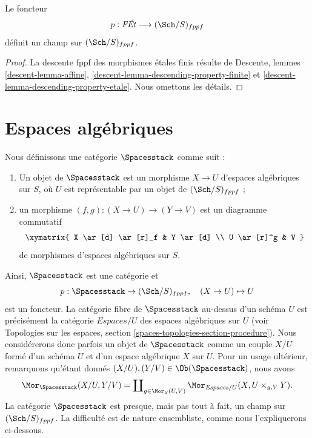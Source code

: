 \begin{lemma}
\label{lemma-finite-etale-stack}
Le foncteur
$$
p : \textit{F\'Et} \longrightarrow (\Sch/S)_{fppf}
$$
définit un champ sur $(\Sch/S)_{fppf}$.
\end{lemma}

\begin{proof}
La descente fppf des morphismes étales finis résulte de
Descente, lemmes \ref{descent-lemma-affine},
\ref{descent-lemma-descending-property-finite} et
\ref{descent-lemma-descending-property-etale}.
Nous omettons les détails.
\end{proof}






\section{Espaces algébriques}
\label{section-stack-of-spaces}

\noindent
Nous définissons une catégorie $\Spacesstack$ comme suit :
\begin{enumerate}
\item Un objet de $\Spacesstack$ est un morphisme $X \to U$
d'espaces algébriques sur $S$, où $U$ est représentable par un objet de
$(\Sch/S)_{fppf}$ ;
\item un morphisme $(f, g) : (X \to U) \to (Y \to V)$
est un diagramme commutatif
$$
\xymatrix{
X \ar[d] \ar[r]_f & Y \ar[d] \\
U \ar[r]^g & V
}
$$
de morphismes d'espaces algébriques sur $S$.
\end{enumerate}
Ainsi, $\Spacesstack$ est une catégorie et
$$
p : \Spacesstack \to (\Sch/S)_{fppf},
\quad
(X \to U) \mapsto U
$$
est un foncteur. La catégorie fibre de $\Spacesstack$ au-dessus
d'un schéma $U$ est précisément la catégorie $\textit{Espaces}/U$ des
espaces algébriques sur $U$ (voir
Topologies sur les espaces, section \ref{spaces-topologies-section-procedure}).
Nous considérerons donc parfois un objet de $\Spacesstack$ comme un
couple $X/U$ formé d'un schéma $U$ et d'un espace algébrique $X$ sur $U$.
Pour un usage ultérieur, remarquons qu'étant donnés
$(X/U), (Y/V) \in \Ob(\Spacesstack)$,
nous avons
\begin{equation}
\label{equation-morphisms-spaces}
\Mor_{\Spacesstack}(X/U, Y/V)
=
\coprod\nolimits_{g \in \Mor_S(U, V)}
\Mor_{\textit{Espaces}/U}(X, U \times_{g, V} Y).
\end{equation}
La catégorie $\Spacesstack$ est presque, mais pas tout à fait, un champ
sur $(\Sch/S)_{fppf}$. La difficulté est de nature ensembliste,
comme nous l'expliquerons ci-dessous.

